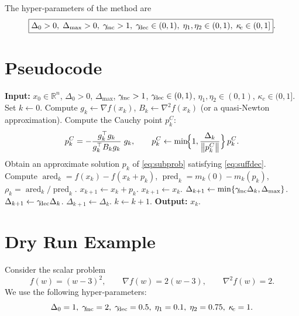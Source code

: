 \documentclass{article}
\newcommand{\norm}[1]{\left\lVert #1\right\rVert}
\newcommand{\R}{\mathbb{R}}
\begin{document}
The hyper‑parameters of the method are
\[
\boxed{\Delta_{0}>0,\;\Delta_{\max}>0,\;\gamma_{\!{\rm inc}}>1,\;
\gamma_{\!{\rm dec}}\in(0,1),\;
\eta_{1},\eta_{2}\in(0,1),\;
\kappa_{\!c}\in(0,1] } .
\]

\section*{Pseudocode}
\begin{algorithm}[H]
\caption{Trust Region Gradient Method (TRGM)}
\begin{algorithmic}[1]
\State \textbf{Input:} $x_{0}\in\R^{n}$, $\Delta_{0}>0$, $\Delta_{\max}$, $\gamma_{\!{\rm inc}}>1$, $\gamma_{\!{\rm dec}}\in(0,1)$,
$\eta_{1},\eta_{2}\in(0,1)$, $\kappa_{\!c}\in(0,1]$.
\State Set $k\gets0$.
    \State Compute $g_{k}\gets\nabla f(x_{k})$, $B_{k}\gets\nabla^{2}f(x_{k})$ (or a quasi‑Newton approximation).
    \State Compute the Cauchy point $p^{C}_{k}$:
          \[
          p^{C}_{k}= -\frac{g_{k}^{\top}g_{k}}{g_{k}^{\top}B_{k}g_{k}}\;g_{k},
          \qquad
          p^{C}_{k}\gets \min\!\Bigl\{1,\frac{\Delta_{k}}{\norm{p^{C}_{k}}}\Bigr\}\,p^{C}_{k}.
          \]
    \State Obtain an approximate solution $p_{k}$ of \eqref{eq:subprob} satisfying \eqref{eq:suffdec}.
    \State Compute 
          $\operatorname{ared}_{k}=f(x_{k})-f(x_{k}+p_{k})$,
          $\operatorname{pred}_{k}=m_{k}(0)-m_{k}(p_{k})$,
          $\rho_{k}= \operatorname{ared}_{k}/\operatorname{pred}_{k}$.
        \State $x_{k+1}\gets x_{k}+p_{k}$.
    \Else
        \State $x_{k+1}\gets x_{k}$.
    \EndIf
        \State $\Delta_{k+1}\gets\min\{\gamma_{\!{\rm inc}}\Delta_{k},\Delta_{\max}\}$.
        \State $\Delta_{k+1}\gets\gamma_{\!{\rm dec}}\Delta_{k}$.
    \Else
        \State $\Delta_{k+1}\gets\Delta_{k}$.
    \EndIf
    \State $k\gets k+1$.
\EndWhile
\State \textbf{Output:} $x_{k}$.
\end{algorithmic}
\end{algorithm}

\section*{Dry Run Example}
Consider the scalar problem
\[
f(w)=(w-3)^{2},\qquad \nabla f(w)=2(w-3),\qquad \nabla^{2}f(w)=2.
\]
We use the following hyper‑parameters:
\[
\Delta_{0}=1,\;\gamma_{\!{\rm inc}}=2,\;\gamma_{\!{\rm dec}}=0.5,\;
\eta_{1}=0.1,\;\eta_{2}=0.75,\;\kappa_{\!c}=1.
\]
\end{document}
